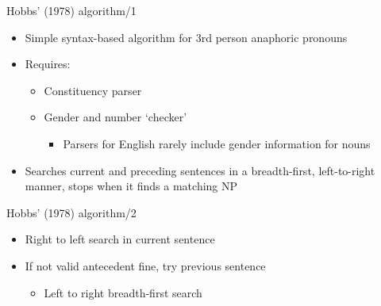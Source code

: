 \documentclass[dvipsnames, 10pt, compress]{beamer}
\begin{document}
\begin{frame}{Hobbs' (1978) algorithm/1}

\begin{itemize}
  \item Simple syntax-based algorithm for 3rd person anaphoric pronouns
  \item Requires:
  \begin{itemize}
     \item Constituency parser
     \item Gender and number `checker'
     \begin{itemize}
        \item Parsers for English rarely include gender information for nouns
     \end{itemize}
  \end{itemize}
  \item Searches current and preceding sentences in a breadth-first, left-to-right
     manner, stops when it finds a matching NP
\end{itemize}

\end{frame}

\begin{frame}{Hobbs' (1978) algorithm/2}

\begin{itemize}
  \item Right to left search in current sentence 
  \item If not valid antecedent fine, try previous sentence
  \begin{itemize}
    \item Left to right breadth-first search
  \end{itemize}
 
\end{itemize}

\end{frame}
\end{document}
